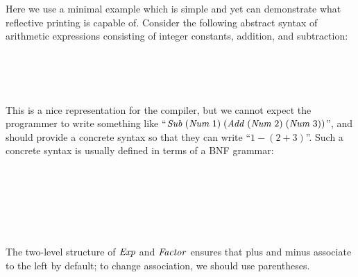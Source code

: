 Here we use a minimal example which is simple and yet can demonstrate what reflective printing is capable of.
Consider the following abstract syntax of arithmetic expressions consisting of integer constants, addition, and subtraction:
\begin{hscode}\SaveRestoreHook
{}%
%
%
%
%
%
%
\>[B]{}\;\<[13]%
\>[13]{}\mathrel{=}{}\<[13E]%
\>[16]{}\;\<[E]%
\\
\>[13]{}\mid {}\<[13E]%
\>[16]{}\;{}\<[21]%
\>[21]{}\;\<[E]%
\\
\>[13]{}\mid {}\<[13E]%
\>[16]{}\;{}\<[21]%
\>[21]{}\;\<[E]%
\\
\>[B]{}\<[3]%
\>[3]{}\;\<[E]%
\ColumnHook
\end{hscode}\resethooks
This is a nice representation for the compiler, but we cannot expect the programmer to write something like ``\ensuremath{\Conid{Sub}\;(\Conid{Num}\;\mathrm{1})\;(\Conid{Add}\;(\Conid{Num}\;\mathrm{2})\;(\Conid{Num}\;\mathrm{3}))}'', and should provide a concrete syntax so that they can write ``$1 - (2+3)$''.
Such a concrete syntax is usually defined in terms of a BNF grammar:
\begin{hscode}\SaveRestoreHook
{}%
%
%
%
%
\>[B]{}\<[9]%
\>[9]{}\to {}\<[9E]%
\>[13]{}\;\;\<[E]%
\\
\>[9]{}\mid {}\<[9E]%
\>[13]{}\;\;\<[E]%
\\
\>[9]{}\mid {}\<[9E]%
\>[13]{}\<[E]%
\\[\blanklineskip]%
\>[B]{}\<[9]%
\>[9]{}\to {}\<[9E]%
\>[13]{}\<[E]%
\\
\>[9]{}\mid {}\<[9E]%
\>[13]{}\;\<[E]%
\\
\>[9]{}\mid {}\<[9E]%
\>[13]{}\;\;\<[E]%
\ColumnHook
\end{hscode}\resethooks
The two-level structure of \ensuremath{\Conid{Exp}} and \ensuremath{\Conid{Factor}} ensures that plus and minus associate to the left by default; to change association, we should use parentheses.
